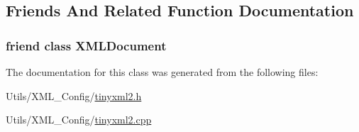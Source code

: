 \subsection{Friends And Related Function Documentation}
\hypertarget{classtinyxml2_1_1_x_m_l_comment_a4eee3bda60c60a30e4e8cd4ea91c4c6e}{
\subsubsection[{X\-M\-L\-Document}]{\setlength{\rightskip}{0pt plus 5cm}friend class {\bf X\-M\-L\-Document}\hspace{0.3cm}{\ttfamily [friend]}}}\label{classtinyxml2_1_1_x_m_l_comment_a4eee3bda60c60a30e4e8cd4ea91c4c6e}


The documentation for this class was generated from the following files\-:\begin{DoxyCompactItemize}
\item 
Utils/\-X\-M\-L\-\_\-\-Config/\hyperlink{tinyxml2_8h}{tinyxml2.\-h}\item 
Utils/\-X\-M\-L\-\_\-\-Config/\hyperlink{tinyxml2_8cpp}{tinyxml2.\-cpp}\end{DoxyCompactItemize}
